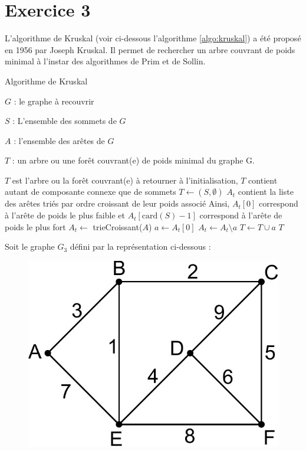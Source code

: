 \documentclass[a4paper,11pt]{article}
\begin{document}
\section*{Exercice 3}

L'algorithme de Kruskal (voir ci-dessous l'algorithme \ref{algo:kruskal}) a été proposé en 1956 par Joseph Kruskal. Il permet de rechercher un arbre couvrant de poids minimal à l'instar des algorithmes de Prim et de Sollin.

\begin{algorithm}
    \caption{Algorithme de Kruskal}
	\label{algo:kruskal}
    \begin{algorithmic}[1]
\Require 

	$G$ : le graphe à recouvrir

	$S$ : L'ensemble des sommets de $G$

	$A$ : l'ensemble des arêtes de $G$

\Ensure 

	$T$ : un arbre ou une forêt couvrant(e) de poids minimal du graphe G.

\Begin
	\State \Comment $T$ est l'arbre ou la forêt couvrant(e) à retourner
	\State \Comment à l'initialisation, $T$ contient autant de composante connexe que de sommets
    \State $T \leftarrow (S, \emptyset)$
    \State \Comment $A_t$ contient la liste des arêtes triés par ordre croissant de leur poids associé
    \State \Comment Ainsi, $A_t[0]$ correspond à l'arête de poids le plus faible
    \State \Comment et $A_t[\text{card}(S) - 1]$ correspond à l'arête de poids le plus fort
    \State $A_t \leftarrow$ trieCroissant($A$)
    	\State $a \leftarrow A_t[0]$
    	\State $A_t \leftarrow A_t \setminus a$
    		\State $T \leftarrow T \cup a$
    	\EndIf
    \EndFor
    \State \Return $T$
\EndBegin
	\end{algorithmic}
\end{algorithm}

Soit le graphe $G_3$ défini par la représentation ci-dessous :
\begin{figure}[h!]
	\centering
	\includegraphics[width=0.25\linewidth]{./graphe3.pdf}
\end{figure}
\end{document}
